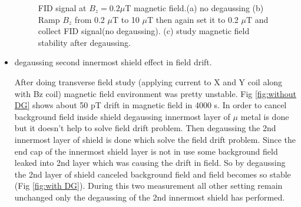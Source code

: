 \begin{itemize}
\begin{figure}
\begin{subfigure}[b]{0.42\textwidth}
        \caption{}
        \label{fig:degauss}
    \end{subfigure}
    \caption{ FID signal at $B_z=0.2 \mu$T magnetic field.(a) no degaussing (b) Ramp $B_z$  from  0.2 $\mu$T to 10 $\mu$T then again set it to 0.2 $\mu$T and collect FID signal(no degaussing). (c) study magnetic field stability after degaussing.}
    \label{fig:ramp updown}
\end{figure}
   
   \item degaussing second innermost shield effect in field drift.
   
   After doing transverse field study (applying current to X and Y coil along with Bz coil) magnetic field environment was pretty unstable. Fig \ref{fig:without DG} shows about 50 pT drift in magnetic field in 4000 s. In order to cancel background field inside shield degaussing innermost layer of $\mu$ metal is done but it doesn't help to solve field drift problem. Then degaussing the 2nd innermost layer of shield is done which solve the field drift problem. Since the end cap of the innermost shield layer is not in use some background field leaked into 2nd layer which was causing the drift in field. So by degaussing the 2nd layer of shield canceled background field and field becomes so stable (Fig \ref{fig:with DG}). During this two measurement all other setting remain unchanged only the degaussing of the 2nd innermost shield has performed.
   
  \begin{figure}
    \centering
 

\end{figure}
\end{itemize}
